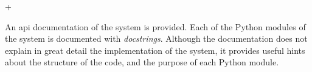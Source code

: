 +%

An \gls{api} documentation of the system is
provided.
Each of the Python modules of the system is documented with
\emph{docstrings}.
Although the documentation does not explain in great detail
the implementation of the system, it provides useful hints
about the structure of the code, and the purpose of each
Python module.
